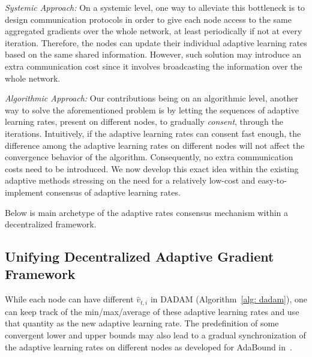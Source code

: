 \documentclass[11pt]{article}
\begin{document}
\textit{Systemic Approach:} 
On a systemic level, one way to alleviate this bottleneck is to design communication protocols in order to give each node access to the same aggregated gradients over the whole network, at least periodically if not at every iteration.
Therefore, the nodes can update their individual adaptive learning rates based on the same shared information. 
However, such solution may introduce an extra communication cost since it involves broadcasting the information over the whole network.

\textit{Algorithmic Approach:} 
Our contributions being on an algorithmic level, another way to solve the aforementioned problem is by letting the sequences of adaptive learning rates, present on different nodes, to gradually \emph{consent}, through the iterations. 
Intuitively, if the adaptive learning rates can consent fast enough, the difference among the adaptive learning rates on different nodes will not affect the convergence behavior of the algorithm.  
Consequently, no extra communication costs need to be introduced.
We now develop this exact idea within the existing adaptive methods stressing on the need for a relatively low-cost and easy-to-implement consensus of adaptive learning rates. 

Below is main archetype of the adaptive rates consensus mechanism within a decentralized framework.


\subsection{Unifying Decentralized Adaptive Gradient Framework}



While each node can have different $\hat v_{t,i}$ in DADAM (Algorithm~\ref{alg: dadam}), one can keep track of the min/max/average of these adaptive learning rates and use that quantity as the new adaptive learning rate. 
The predefinition of some convergent lower and upper bounds may also lead to a gradual synchronization of the adaptive learning rates on different nodes as developed for AdaBound in~\cite{luo2019adaptive}.
\end{document}
